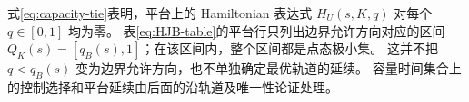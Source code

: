 式\eqref{eq:capacity-tie}表明，平台上的 Hamiltonian 表达式
$H_U(s,K,q)$ 对每个 $q\in[0,1]$ 均为零。
表\eqref{eq:HJB-table}的平台行只列出边界允许方向对应的区间
$Q_K(s)=[q_B(s),1]$；在该区间内，整个区间都是点态极小集。
这并不把 $q<q_B(s)$ 变为边界允许方向，也不单独确定最优轨道的延续。
容量时间集合上的控制选择和平台延续由后面的沿轨道及唯一性论证处理。
